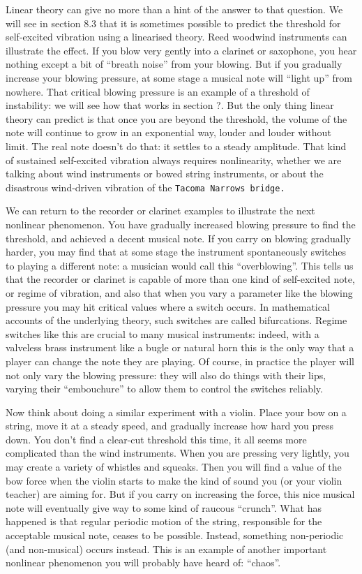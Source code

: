   Linear theory can give no more than a hint of the answer to that question. We 
  will see in section 8.3 that it is sometimes possible to predict the 
  threshold for self-excited vibration using a linearised theory. Reed woodwind 
  instruments can illustrate the effect. If you blow very gently into a 
  clarinet or saxophone, you hear nothing except a bit of “breath noise” from 
  your blowing. But if you gradually increase your blowing pressure, at some 
  stage a musical note will “light up” from nowhere. That critical blowing 
  pressure is an example of a threshold of instability: we will see how that 
  works in section ?. But the only thing linear theory can predict is that once 
  you are beyond the threshold, the volume of the note will continue to grow in 
  an exponential way, louder and louder without limit. The real note doesn’t do 
  that: it settles to a steady amplitude. That kind of sustained self-excited 
  vibration always requires nonlinearity, whether we are talking about wind 
  instruments or bowed string instruments, or about the disastrous wind-driven 
  vibration of the \tt{}Tacoma Narrows bridge\rm{}. 

  We can return to the recorder or clarinet examples to illustrate the next 
  nonlinear phenomenon. You have gradually increased blowing pressure to find 
  the threshold, and achieved a decent musical note. If you carry on blowing 
  gradually harder, you may find that at some stage the instrument 
  spontaneously switches to playing a different note: a musician would call 
  this “overblowing”. This tells us that the recorder or clarinet is capable of 
  more than one kind of self-excited note, or regime of vibration, and also 
  that when you vary a parameter like the blowing pressure you may hit critical 
  values where a switch occurs. In mathematical accounts of the underlying 
  theory, such switches are called bifurcations. Regime switches like this are 
  crucial to many musical instruments: indeed, with a valveless brass 
  instrument like a bugle or natural horn this is the only way that a player 
  can change the note they are playing. Of course, in practice the player will 
  not only vary the blowing pressure: they will also do things with their lips, 
  varying their “embouchure” to allow them to control the switches reliably. 

  Now think about doing a similar experiment with a violin. Place your bow on a 
  string, move it at a steady speed, and gradually increase how hard you press 
  down. You don't find a clear-cut threshold this time, it all seems more 
  complicated than the wind instruments. When you are pressing very lightly, 
  you may create a variety of whistles and squeaks. Then you will find a value 
  of the bow force when the violin starts to make the kind of sound you (or 
  your violin teacher) are aiming for. But if you carry on increasing the 
  force, this nice musical note will eventually give way to some kind of 
  raucous “crunch”. What has happened is that regular periodic motion of the 
  string, responsible for the acceptable musical note, ceases to be possible. 
  Instead, something non-periodic (and non-musical) occurs instead. This is an 
  example of another important nonlinear phenomenon you will probably have 
  heard of: “chaos”. 

